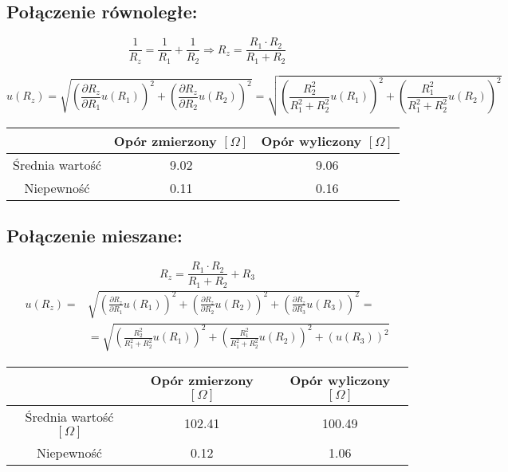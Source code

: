 \documentclass{article}
\begin{document}
	\subsection{Połączenie równoległe:}
	\[
	    \frac{1}{R_z}=\frac{1}{R_1}+\frac{1}{R_2} \Rightarrow R_z = \frac{R_1\cdot R_2}{R_1+R_2}
	\]
	
	\[
	    u(R_z)=\sqrt{\left(\frac{\partial{}R_z}{\partial{}R_1}u(R_1)\right)^2 + \left(\frac{\partial{}R_z}{\partial{}R_2}u(R_2)\right)^2} = \sqrt{\left(\frac{R_2^2}{R_1^2+R_2^2}u(R_1)\right)^2+\left(\frac{R_1^2}{R_1^2+R_2^2}u(R_2)\right)^2}
	\]
	
	\begin{table}[!htb]
        \begin{tabular}{|c|c|c|}
        \hline
                            &   Opór zmierzony    $\left[\Omega\right]$   & Opór wyliczony   $\left[\Omega\right]$  \\ \hline
         Średnia wartość    &   9.02               & 9.06             \\ \hline
         Niepewność         &   0.11                & 0.16              \\ \hline
        \end{tabular}
    \end{table}
    
	\subsection{Połączenie mieszane:}
	
	\[
	    R_z=\frac{R_1\cdot R_2}{R_1+R_2}+R_3
	\]
    \begin{equation}
    \nonumber
    \begin{split}
	    u(R_z)= & \sqrt{\left(\frac{\partial{}R_z}{\partial{}R_1}u(R_1)\right)^2 + \left(\frac{\partial{}R_z}{\partial{}R_2}u(R_2)\right)^2+ \left(\frac{\partial{}R_z}{\partial{}R_3}u(R_3)\right)^2} = \\ & = \sqrt{\left(\frac{R_2^2}{R_1^2+R_2^2}u(R_1)\right)^2+  \left(\frac{R_1^2}{R_1^2+R_2^2}u(R_2)\right)^2 +\left( u(R_3)\right)^2}
    \end{split}
    \end{equation}
    
	\begin{table}[!htb]
        \begin{tabular}{|c|c|c|}
        \hline
                                &   Opór zmierzony   $\left[\Omega\right]$   & Opór wyliczony  $\left[\Omega\right]$  \\ \hline
         Średnia wartość  
         $\left[\Omega\right]$  &   102.41              & 100.49            \\ \hline
         Niepewność             &   0.12                & 1.06                  \\ \hline
        \end{tabular}
    \end{table}
    \pagebreak
\end{document}
